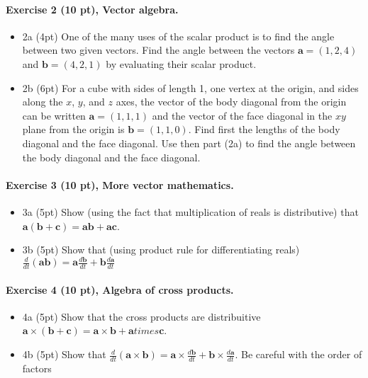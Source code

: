 \documentclass[%
oneside,                 %
final,                   %
10pt]{article}
\begin{document}
\noindent
\paragraph{Exercise 2 (10 pt), Vector algebra.}
\begin{itemize}
\item 2a (4pt) One of the many uses of the scalar product is to find the angle between two given vectors. Find the angle between the vectors $\bm{a}=(1,2,4)$ and $\bm{b}=(4,2,1)$ by evaluating their scalar product.

\item 2b (6pt) For a cube with sides of length 1, one vertex at the origin, and sides along the $x$, $y$, and $z$ axes, the vector of the body diagonal from the origin can be written $\bm{a}=(1, 1, 1)$ and the vector of the face diagonal in the $xy$ plane from the origin is $\bm{b}=(1,1,0)$. Find first the lengths of the body diagonal and the face diagonal. Use then part (2a) to find the angle between the body diagonal and the face diagonal.
\end{itemize}

\noindent
\paragraph{Exercise 3 (10 pt), More vector mathematics.}
\begin{itemize}
\item 3a (5pt) Show (using the fact that multiplication of reals is distributive) that $\bm{a}(\bm{b}+\bm{c})=\bm{a}\bm{b}+\bm{a}\bm{c}$.

\item 3b (5pt) Show that (using product rule for differentiating reals)  $\frac{d}{dt}(\bm{a}\bm{b})=\bm{a}\frac{d\bm{b}}{dt}+\bm{b}\frac{d\bm{a}}{dt}$
\end{itemize}

\noindent
\paragraph{Exercise 4 (10 pt), Algebra of cross products.}
\begin{itemize}
\item 4a (5pt) Show that the cross products are distribuitive $\bm{a}\times(\bm{b}+\bm{c})=\bm{a}\times\bm{b}+\bm{a}times\bm{c}$.

\item 4b (5pt) Show that $\frac{d}{dt}(\bm{a}\times\bm{b})=\bm{a}\times\frac{d\bm{b}}{dt}+\bm{b}\times\frac{d\bm{a}}{dt}$. Be careful with the order of factors 
\end{itemize}
\end{document}
